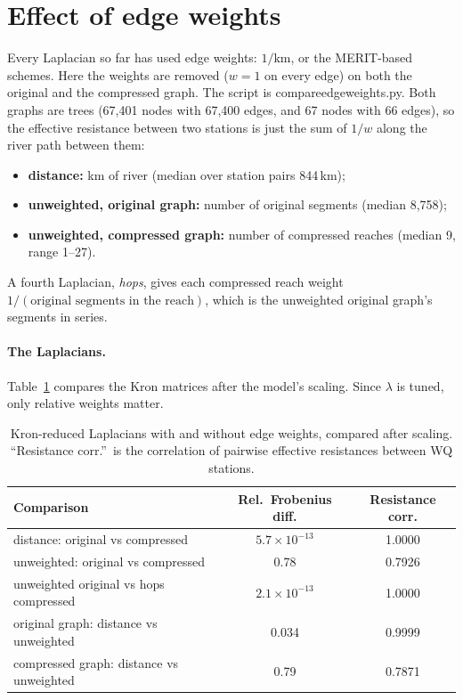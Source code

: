 \documentclass[11pt]{article}
\newcommand{\codeus}{\textunderscore\allowbreak}
\newcommand{\code}[1]{{\ttfamily\let\_\codeus #1}}
\begin{document}
\section{Effect of edge weights}
\label{sec:weights}

Every Laplacian so far has used edge weights: $1/\text{km}$, or the MERIT-based schemes. Here the
weights are removed ($w=1$ on every edge) on both the original and the compressed graph. The script is
\code{compare\_edge\_weights.py}. Both graphs are trees (67{,}401 nodes with 67{,}400 edges, and 67
nodes with 66 edges), so the effective resistance between two stations is just the sum of $1/w$ along
the river path between them:
\begin{itemize}
  \item \textbf{distance:} km of river (median over station pairs 844\,km);
  \item \textbf{unweighted, original graph:} number of original segments (median 8{,}758);
  \item \textbf{unweighted, compressed graph:} number of compressed reaches (median 9, range 1--27).
\end{itemize}
A fourth Laplacian, \emph{hops}, gives each compressed reach weight $1/(\text{original segments in the
reach})$, which is the unweighted original graph's segments in series.

\paragraph{The Laplacians.} Table~\ref{tab:weightmatrix} compares the Kron matrices after the model's
scaling. Since $\lambda$ is tuned, only relative weights matter.

\begin{table}[h]
\centering
\small
\caption{Kron-reduced Laplacians with and without edge weights, compared after scaling. ``Resistance
corr.''\ is the correlation of pairwise effective resistances between WQ stations.}
\label{tab:weightmatrix}
\begin{tabular}{l c c}
\toprule
Comparison & {Rel.\ Frobenius diff.} & {Resistance corr.} \\
\midrule
distance: original vs compressed           & $5.7\times10^{-13}$ & 1.0000 \\
unweighted: original vs compressed         & 0.78                & 0.7926 \\
unweighted original vs hops compressed     & $2.1\times10^{-13}$ & 1.0000 \\
original graph: distance vs unweighted     & 0.034               & 0.9999 \\
compressed graph: distance vs unweighted   & 0.79                & 0.7871 \\
\bottomrule
\end{tabular}
\end{table}
\end{document}
